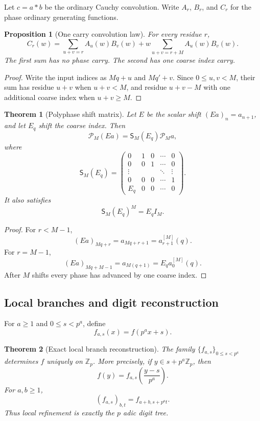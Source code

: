 \documentclass{aomart}
\newtheorem{theorem}{Theorem}[section]
\newtheorem{proposition}[proposition]{Proposition}
\theoremstyle{definition}
\theoremstyle{remark}
\begin{document}
Let \(c=a*b\) be the ordinary Cauchy convolution. Write \(A_r\), \(B_r\), and \(C_r\) for the phase ordinary generating functions.

\begin{proposition}[One carry convolution law]\label{prop:polyphase_carry_convolution}
For every residue \(r\),
\[
\boxed{
C_r(w)
=
\sum_{u+v=r}A_u(w)B_v(w)
+
w\sum_{u+v=r+M}A_u(w)B_v(w).
}
\]
The first sum has no phase carry. The second has one coarse index carry.
\end{proposition}

\begin{proof}
Write the input indices as \(Mq+u\) and \(Mq'+v\). Since \(0\leq u,v<M\), their sum has residue \(u+v\) when \(u+v<M\), and residue \(u+v-M\) with one additional coarse index when \(u+v\geq M\).
\end{proof}

\begin{theorem}[Polyphase shift matrix]\label{thm:polyphase_shift_matrix}
Let \(E\) be the scalar shift \((Ea)_n=a_{n+1}\), and let \(E_q\) shift the coarse index. Then
\[
\boxed{
\mathcal P_M(Ea)
=
\mathsf S_M(E_q)\mathcal P_Ma,
}
\]
where
\[
\mathsf S_M(E_q)
=
\begin{pmatrix}
0&1&0&\cdots&0\\
0&0&1&\cdots&0\\
\vdots&&&\ddots&\vdots\\
0&0&0&\cdots&1\\
E_q&0&0&\cdots&0
\end{pmatrix}.
\]
It also satisfies
\[
\boxed{\mathsf S_M(E_q)^M=E_qI_M.}
\]
\end{theorem}

\begin{proof}
For \(r<M-1\),
\[
(Ea)_{Mq+r}=a_{Mq+r+1}=a_{r+1}^{[M]}(q).
\]
For \(r=M-1\),
\[
(Ea)_{Mq+M-1}=a_{M(q+1)}=E_qa_0^{[M]}(q).
\]
After \(M\) shifts every phase has advanced by one coarse index.
\end{proof}

\subsection{Local branches and digit reconstruction}

For \(a\geq1\) and \(0\leq s<p^a\), define
\[
f_{a,s}(x)=f(p^ax+s).
\]

\begin{theorem}[Exact local branch reconstruction]\label{thm:local_branch_reconstruction}
The family \(\{f_{a,s}\}_{0\leq s<p^a}\) determines \(f\) uniquely on \(\mathbb Z_p\). More precisely, if \(y\in s+p^a\mathbb Z_p\), then
\[
\boxed{
f(y)=f_{a,s}\left(\frac{y-s}{p^a}\right).
}
\]
For \(a,b\geq1\),
\[
\boxed{
(f_{a,s})_{b,t}
=
f_{a+b,s+p^at}.
}
\]
Thus local refinement is exactly the \(p\) adic digit tree.
\end{theorem}
\end{document}
